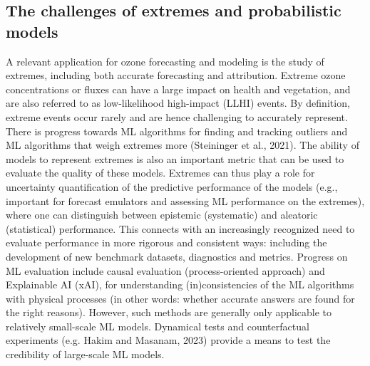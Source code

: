 \documentclass[gmd, manuscript]{copernicus}
\begin{document}
\subsection{The challenges of extremes and probabilistic models}

A relevant application for ozone forecasting and modeling is the study of extremes, including both accurate forecasting and attribution. Extreme ozone concentrations or fluxes can have a large impact on health and vegetation, and are also referred to as low-likelihood high-impact (LLHI) events. By definition, extreme events occur rarely and are hence challenging to accurately represent. There is progress towards ML algorithms for finding and tracking outliers and ML algorithms that weigh extremes more (Steininger et al., 2021). The ability of models to represent extremes is also an important metric that can be used to evaluate the quality of these models. Extremes can thus play a role for uncertainty quantification of the predictive performance of the models (e.g., important for forecast emulators and assessing ML performance on the extremes), where one can distinguish between epistemic (systematic) and aleatoric (statistical) performance. This connects with an increasingly recognized need to evaluate performance in more rigorous and consistent ways: including the development of new benchmark datasets, diagnostics and metrics. Progress on ML evaluation include causal evaluation (process-oriented approach) and Explainable AI (xAI), for understanding (in)consistencies of the ML algorithms with physical processes (in other words: whether accurate answers are found for the right reasons). However, such methods are generally only applicable to relatively small-scale ML models. Dynamical tests and counterfactual experiments (e.g. Hakim and Masanam, 2023) provide a means to test the credibility of large-scale ML models.
\end{document}
